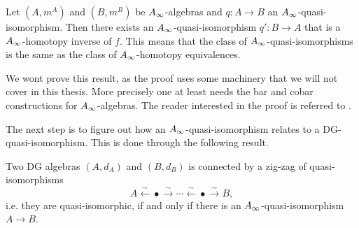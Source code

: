 \begin{proposition}
\label{prop:infty-qi_homotopy_invertible}
Let $(A, m^A)$ and $(B, m^B)$ be $A_{\infty}$-algebras and $q:A\rightarrow B$ an $A_{\infty}$-quasi-isomorphism. Then there exists an $A_{\infty}$-quasi-isomorphism $q':B\rightarrow A$ that is a $A_{\infty}$-homotopy inverse of $f$. This means that the class of $A_{\infty}$-quasi-isomorphisms is the same as the class of $A_{\infty}$-homotopy equivalences. 
\end{proposition}

We wont prove this result, as the proof uses some machinery that we will not cover in this thesis. More precisely one at least needs the bar and cobar constructions for $A_{\infty}$-algebras. The reader interested in the proof is referred to \cite[Corollary 1.3.1.3]{french1}. 

The next step is to figure out how an $A_{\infty}$-quasi-isomorphism relates to a DG-quasi-isomorphism. This is done through the following result.

\begin{corollary}
\label{cor:zigzag-quasi}
Two DG algebras $(A, d_A)$ and $(B, d_B)$ is connected by a zig-zag of quasi-isomorphisms
\begin{equation*}
    A \overset{\sim}\longleftarrow \bullet \overset{\sim}\longrightarrow \cdots \overset{\sim}\longleftarrow \bullet \overset{\sim}\longrightarrow B, 
\end{equation*}
i.e. they are quasi-isomorphic, if and only if there is an $A_{\infty}$-quasi-isomorphism $A\rightarrow B$. 
\end{corollary}

